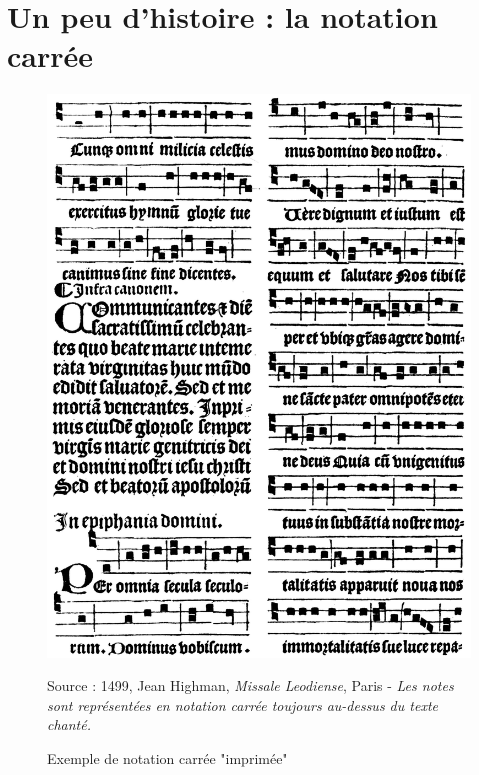 \section{Un peu d'histoire : la notation carrée}
\label{sec:exempleNotationCarree}
\begin{figure}[H]
	\centering
	\includegraphics[keepaspectratio=true, width=\textwidth]{Annexes/i/notationCarree.jpg}
	\caption{Exemple de notation carrée "imprimée"}
	\medskip
	\small
	Source : 1499, Jean Highman, \textit{Missale Leodiense}, Paris - \textit{Les notes sont représentées en notation carrée toujours au-dessus du texte chanté.}
	\label{fig:notationCarree}
\end{figure}
\clearpage

